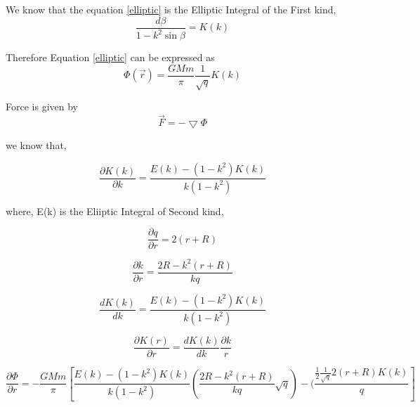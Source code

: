 \begin{center}
We know that the equation \eqref{elliptic} is the Elliptic Integral of the First kind,
\begin{equation}
\frac{d \beta } {1 - k^2 \sin \beta } = K (k) 
\end{equation}
 
Therefore Equation \eqref{elliptic} can be expressed as
\begin{equation}
 \Phi (\vec{r}) = \frac{GMm}{ \pi} \frac{1}{\sqrt{q}} K (k) 
\end{equation}

Force is given by
\begin{equation}
 \vec{F} = - \bigtriangledown  \Phi 
\end{equation}
\end{center}

we know that,
\begin{center}

\begin{equation}
\frac{\partial K (k)}{\partial k } = \frac{E(k)- (1-k^2) K(k)}{k(1- k^2)} 
\end{equation}
\end{center}
where, E(k) is the Eliiptic Integral of Second kind,

\begin{center}

\begin{equation}
 \frac{\partial q}{\partial r} = 2 (r + R)
\end{equation}

\begin{equation}
 \frac{\partial k}{\partial r} = \frac{2R - k^2 (r + R)}{kq} 
\end{equation}

\begin{equation}
\frac{d K(k)}{d k} = \frac{E(k) - (1-k^2) K(k)}{k (1-k^2)} 
\end{equation}

\begin{equation}
\frac{\partial K (r)}{\partial r} = \frac{d K(k)}{dk} \frac{\partial k }{r} 
\end{equation}

\begin{equation}
\frac{\partial \Phi}{\partial r} = - \frac{GMm }{\pi} [ \frac{E(k) - (1-k^2) K(k)}{k (1-k^2)} (\frac{2R - k^2 (r + R)}{kq} \sqrt{q}) - (\frac{\frac{1}{2} \frac{1}{\sqrt{q}}2 (r + R ) K(k)} {q}] 
\end{equation}

\end{center}

